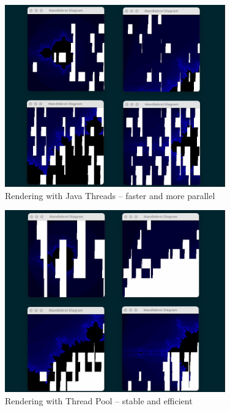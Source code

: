 \documentclass[a4paper,12pt]{article}
\begin{document}
\begin{figure}[H]
    \centering
    \includegraphics[width=0.85\textwidth]{lab02-img04}
    \caption{Rendering with Java Threads – faster and more parallel}
    \label{fig:mandelbrot_threads}
\end{figure}

\begin{figure}[H]
    \centering
    \includegraphics[width=0.85\textwidth]{lab02-img05}
    \caption{Rendering with Thread Pool – stable and efficient}
    \label{fig:mandelbrot_pool}
\end{figure}
\end{document}

